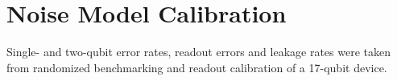 \chapter{Noise Model Calibration}
\label{app:a}

Single- and two-qubit error rates, readout errors and leakage rates were taken from randomized
benchmarking and readout calibration of a 17-qubit device.
